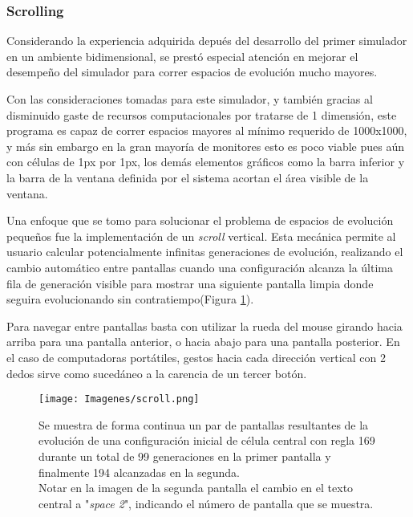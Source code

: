 \documentclass[]{article}
\begin{document}
			\subsubsection{Scrolling}
				\justifying
				Considerando la experiencia adquirida depués del desarrollo del primer simulador en un ambiente bidimensional, se prestó especial atención en mejorar el desempeño del simulador para correr espacios de evolución mucho mayores.
				
				\hfill\break
				\justifying
				Con las consideraciones tomadas para este simulador, y también gracias al disminuido gaste de recursos computacionales por tratarse de 1 dimensión, este programa es capaz de correr espacios mayores al mínimo requerido de 1000x1000, y más sin embargo en la gran mayoría de monitores esto es poco viable pues aún con células de 1px por 1px, los demás elementos gráficos como la barra inferior y la barra de la ventana definida por el sistema acortan el área visible de la ventana.
				
				\hfill\break
				\justifying
				Una enfoque que se tomo para solucionar el problema de espacios de evolución pequeños fue la implementación de un \textit{scroll} vertical. Esta mecánica permite al usuario calcular potencialmente infinitas generaciones de evolución, realizando el cambio automático entre pantallas cuando una configuración alcanza la última fila de generación visible para mostrar una siguiente pantalla limpia donde seguira evolucionando sin contratiempo(Figura \ref{Scroll}).
				
				\hfill\break
				\justifying
				Para navegar entre pantallas basta con utilizar la rueda del mouse girando hacia arriba para una pantalla anterior, o hacia abajo para una pantalla posterior. En el caso de computadoras portátiles, gestos hacia cada dirección vertical con 2 dedos sirve como sucedáneo a la carencia de un tercer botón.
				
				\newpage
				\begin{figure}[!h]
					\centering
					\texttt{[image: Imagenes/scroll.png]}
					\caption{Se muestra de forma continua un par de pantallas resultantes de la evolución de una configuración inicial de célula central con regla 169 durante un total de 99 generaciones en la primer pantalla y finalmente 194 alcanzadas en la segunda.\\Notar en la imagen de la segunda pantalla el cambio en el texto central a "\textit{space 2}", indicando el número de pantalla que se muestra.}
					\label{Scroll}
				\end{figure}
			\newpage
			
\end{document}
